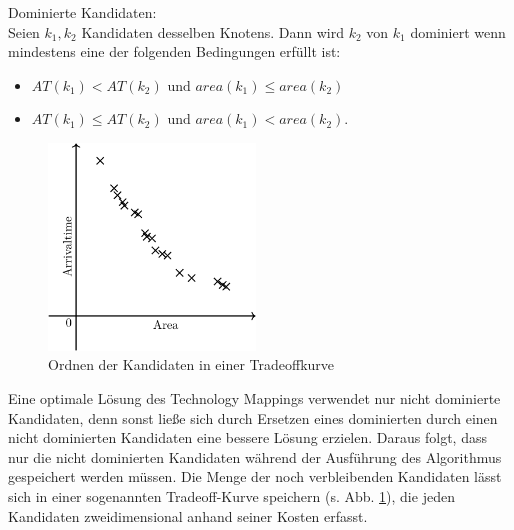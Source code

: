 \documentclass[11pt, a4paper, german]{article}
\begin{document}
\begin{definition}{Dominierte Kandidaten:}\\
	Seien $k_1, k_2$ Kandidaten desselben Knotens. Dann wird $k_2$ von $k_1$ dominiert wenn mindestens eine der folgenden Bedingungen erfüllt ist:
	\begin{itemize}
	\item $AT(k_1) < AT(k_2) \text { und  }area(k_1) \leq area(k_2)$
	\item $	AT(k_1) \leq AT(k_2) \text{ und } area(k_1) < area(k_2)$.
	\end{itemize}
\end{definition}

 \begin{figure}
		\includegraphics[width = 5.5cm]{pictures/compiled/tradeoff_kurve}
		\caption{Ordnen der Kandidaten in einer Tradeoffkurve}
		\label{bild:tradeoff_kurve}
\end{figure}
Eine optimale Lösung des Technology Mappings verwendet nur nicht dominierte Kandidaten, denn sonst ließe sich durch Ersetzen eines dominierten durch einen nicht dominierten Kandidaten eine bessere Lösung erzielen.
Daraus folgt, dass nur die nicht dominierten Kandidaten während der Ausführung des Algorithmus gespeichert werden müssen.
Die Menge der noch verbleibenden Kandidaten lässt sich in einer sogenannten Tradeoff-Kurve speichern (s. Abb. \ref{bild:tradeoff_kurve}), die jeden Kandidaten zweidimensional anhand seiner Kosten erfasst.
\end{document}
